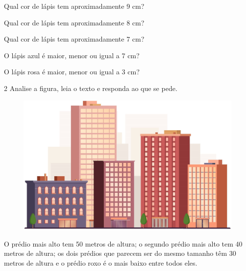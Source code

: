 \begin{escolha}
\item  Qual cor de lápis tem aproximadamente 9 cm?

\item  Qual cor de lápis tem aproximadamente 8 cm?

\item  Qual cor de lápis tem aproximadamente 7 cm?

\item  O lápis azul é maior, menor ou igual a 7 cm?

\item  O lápis rosa é maior, menor ou igual a 3 cm?
\end{escolha}

\pagebreak
\num{2} Analise a figura, leia o texto e responda ao que se pede.


\begin{figure}[htpb!]
\includegraphics[width=\textwidth]{./media/image31.png}
\end{figure}

O prédio mais alto tem 50 metros de altura; o segundo prédio mais alto
tem 40 metros de altura; os dois prédios que parecem ser do mesmo
tamanho têm 30 metros de altura e o prédio roxo é o mais baixo entre
todos eles.

